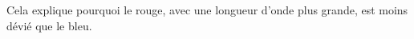 \documentclass[french]{yLectureNote}
\begin{document}
Cela explique pourquoi le rouge, avec une longueur d'onde plus grande,  est moins dévié que le bleu.
%
%
%
%
%
%
%
%
%
%
%
%
%
%
%
\end{document}

